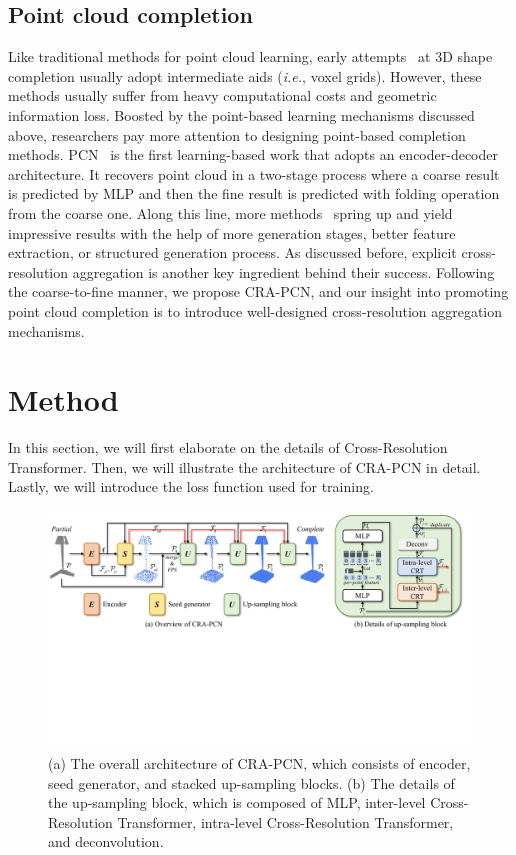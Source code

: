 \documentclass[letterpaper]{article} %
\begin{document}
\subsection{Point cloud completion}
Like traditional methods for point cloud learning, early attempts~\cite{choy20163d, girdhar2016learning, han2017high} at 3D shape completion usually adopt intermediate aids ({\em i.e.}, voxel grids).
However, these methods usually suffer from heavy computational costs and geometric information loss.
Boosted by the point-based learning mechanisms discussed above, researchers pay more attention to designing point-based completion methods.
PCN~\cite{yuan2018pcn} is the first learning-based work that adopts an encoder-decoder architecture.
It recovers point cloud in a two-stage process where a coarse result is predicted by MLP and then the fine result is predicted with folding operation~\cite{yang2018foldingnet} from the coarse one.
Along this line, more methods~\cite{xiang2021snowflakenet, zhou2022seedformer,yan2022fbnet,tang2022lake,wang2022learning, li2023proxyformer, chen2023anchorformer} spring up and
yield impressive results with the help of  more generation stages, better feature extraction, or structured
generation process.
As discussed before, explicit cross-resolution aggregation is another key ingredient behind their success.
Following the coarse-to-fine manner, we propose CRA-PCN, and our insight into promoting point cloud completion is to introduce well-designed cross-resolution aggregation mechanisms.

\section {Method}
In this section, we will first elaborate on the details of Cross-Resolution Transformer.
Then, we will illustrate the architecture of CRA-PCN in detail.
Lastly, we will introduce the loss function used for training.

\begin{figure}[t]
\begin{center}
\includegraphics[width=1.0\linewidth]{Figures/arc.pdf}
\end{center}
\caption{
(a) The overall architecture of CRA-PCN, which consists of encoder, seed generator, and stacked up-sampling blocks.
(b) The details of the up-sampling block, which is composed of MLP, inter-level Cross-Resolution Transformer, intra-level Cross-Resolution Transformer, and deconvolution.}
\label{fig:arc}
\end{figure}
\end{document}
